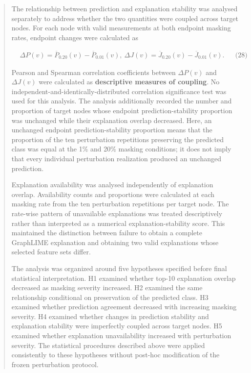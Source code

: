 \documentclass[a4paper]{article}
\begin{document}
\begin{quote}
The relationship between prediction and explanation stability was
analysed separately to address whether the two quantities were coupled
across target nodes. For each node with valid measurements at both
endpoint masking rates, endpoint changes were calculated as

\[\begin{matrix}
 & \Delta P(v) = {\overline{P}}_{0.20}(v) - {\overline{P}}_{0.01}(v),\ \Delta J(v) = {\overline{J}}_{0.20}(v) - {\overline{J}}_{0.01}(v). & & \text{(28)}
\end{matrix}
\]

Pearson and Spearman correlation coefficients between \(\Delta P(v)\)
and \(\Delta J(v)\) were calculated as \textbf{descriptive measures of
coupling}. No independent-and-identically-distributed correlation
significance test was used for this analysis. The analysis additionally
recorded the number and proportion of target nodes whose endpoint
prediction-stability proportion was unchanged while their explanation
overlap decreased. Here, an unchanged endpoint prediction-stability
proportion means that the proportion of the ten perturbation repetitions
preserving the predicted class was equal at the 1\% and 20\% masking
conditions; it does not imply that every individual perturbation
realization produced an unchanged prediction.

Explanation availability was analysed independently of explanation
overlap. Availability counts and proportions were calculated at each
masking rate from the ten perturbation repetitions per target node. The
rate-wise pattern of unavailable explanations was treated descriptively
rather than interpreted as a numerical explanation-stability score. This
maintained the distinction between failure to obtain a complete
GraphLIME explanation and obtaining two valid explanations whose
selected feature sets differ.

The analysis was organized around five hypotheses specified before final
statistical interpretation. H1 examined whether top-10 explanation
overlap decreased as masking severity increased. H2 examined the same
relationship conditional on preservation of the predicted class. H3
examined whether prediction agreement decreased with increasing masking
severity. H4 examined whether changes in prediction stability and
explanation stability were imperfectly coupled across target nodes. H5
examined whether explanation unavailability increased with perturbation
severity. The statistical procedures described above were applied
consistently to these hypotheses without post-hoc modification of the
frozen perturbation protocol.


\end{quote}
\end{document}
